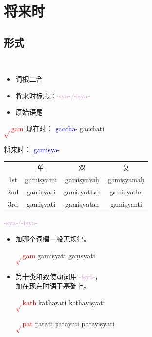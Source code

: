 \documentclass[17pt]{beamer}
\newcommand{\verbroot}[1]{\textcolor{red}{$\sqrt{}$#1}}
\newcommand{\verbstem}[1]{\textcolor{blue}{#1\nobreakdash-}}
\newcommand{\fullpada}[1]{\textcolor{OliveGreen}{#1}}
\newcommand{\pratyaya}[1]{\textcolor{Plum}{#1}}
\begin{document}
\section{将来时}
\begin{frame}{\insertsection }
    \small
    \tableofcontents[currentsection]
\end{frame}

\subsection{形式}
\begin{frame}{\insertsection ~~\insertsubsection}
  \begin{itemize}
    \item 词根二合
    \item 将来时标志：\pratyaya{\nobreakdash-sya\nobreakdash-/\nobreakdash-iṣya\nobreakdash-}
    \item 原始语尾  
  \end{itemize}
\end{frame}

\begin{frame}{\verbroot{gam}}
  现在时： \verbstem{\nobreakdash gaccha} \fullpada{\nobreakdash gacchati}
  \bigskip


  将来时： \verbstem{\nobreakdash gamiṣya} 
  \bigskip

  \centering
  \begin{tabular}{@{}cccc@{}} %
    & 单 & 双 & 复  \\
    1st & \fullpada{gamiṣyāmi} & \fullpada{gamiṣyāvaḥ}  & \fullpada{gamiṣyāmaḥ}  \\
    2nd & \fullpada{gamiṣyasi} & \fullpada{gamiṣyathaḥ} & \fullpada{gamiṣyatha}   \\
    3rd & \fullpada{gamiṣyati} & \fullpada{gamiṣyataḥ} & \fullpada{gamiṣyanti}  \\
  \end{tabular}
\end{frame}

\begin{frame}{\pratyaya{\nobreakdash-sya\nobreakdash-/\nobreakdash-iṣya\nobreakdash-}}
  \begin{itemize}
    \item 加哪个词缀一般无规律。

    \verbroot{gam} \fullpada{gamiṣyati}  \fullpada{gaṃsyati}
    \item 第十类和致使动词用 \pratyaya{\nobreakdash-iṣya\nobreakdash-}，\\加在现在时语干基础上。
    
    \verbroot{kath} \fullpada{kathayati} \fullpada{kathayiṣyati} 

    \verbroot{pat} \fullpada{patati} \fullpada{pātayati} \fullpada{pātayiṣyati} 
  \end{itemize}    
\end{frame}
\end{document}
